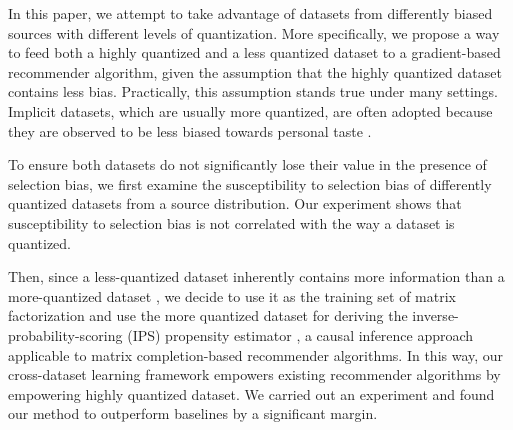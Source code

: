 \documentclass{article}
\begin{document}
In this paper, we attempt to take advantage of datasets from differently biased sources with different levels of quantization. More specifically, we propose a way to feed both a highly quantized and a less quantized dataset to a gradient-based recommender algorithm, given the assumption that the highly quantized dataset contains less bias. Practically, this assumption stands true under many settings. 
Implicit datasets, which are usually more quantized, are often adopted because they are observed to be less biased towards personal taste \cite{amatriain2009like,jawaheer2010comparison}.

To ensure both datasets do not significantly lose their value in the presence of selection bias, we first examine the susceptibility to selection bias of differently quantized datasets from a source distribution. Our experiment shows that susceptibility to selection bias is not correlated with the way a dataset is quantized. 

Then, since a less-quantized dataset inherently contains more information than a more-quantized dataset \cite{widrow1996statistical}, we decide to use it as the training set of matrix factorization and use the more quantized dataset for deriving the inverse-probability-scoring (IPS) propensity estimator \cite{thompson2012sampling,imbens2015causal}, a causal inference approach applicable to matrix completion-based recommender algorithms. In this way, our cross-dataset learning framework empowers existing recommender algorithms by empowering highly quantized dataset. We carried out an experiment and found our method to outperform baselines by a significant margin.

\end{document}
